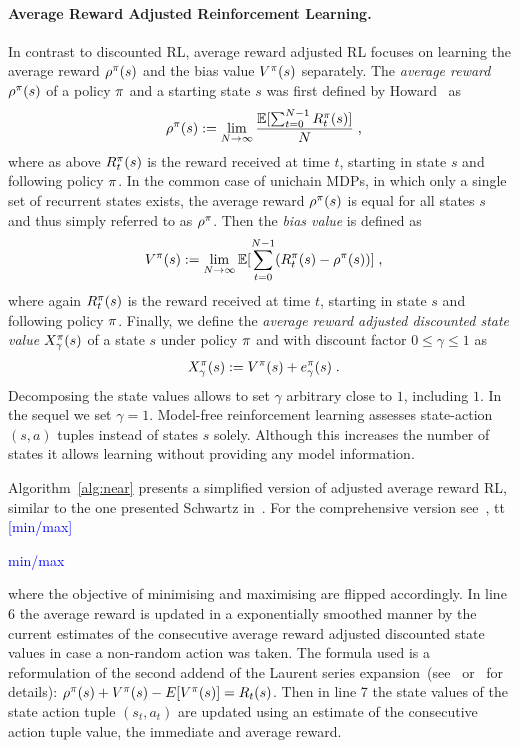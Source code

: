 \documentclass[envcountsame]{llncs}
\newcommand\MS[2][r]{\ifx t#1 \textcolor{blue}{[#2]}%
\else \begin{center}\textcolor{blue}{#2} \end{center} \fi}%
\begin{document}
\paragraph{Average Reward Adjusted Reinforcement Learning.} In contrast to discounted RL, average
reward adjusted RL focuses on learning the average reward \(\rho^{\pi}(s)\) and the bias value
\(V^{\pi}(s)\) separately.
%
The \textit{average reward} \(\rho^{\pi}(s)\) of a policy \(\pi\) and a starting state \(s\)
was first defined by Howard~\cite{howard1960dynamic} as
%
\begin{align*}
  \avgrew^{\pol}(s) \defsym \lim_{N \to \infty} \frac{\E [\sum_{t=0}^{N-1}R_{t}^{\pol}(s)]}{N}\tcom
\end{align*}
%
where as above \(R_{t}^{\pi}(s)\) is the reward received at time \(t\), starting in state \(s\) and
following policy \(\pi\). In the common case of unichain MDPs, in which only a single set of
recurrent states exists, the average reward \(\rho^{\pi}(s)\) is equal for all states
\(s\)~\cite{Mahadevan96_AverageRewardReinforcementLearningFoundationsAlgorithmsAndEmpiricalResults,Puterman94}
and thus simply referred to as \(\rho^{\pi}\). Then the \textit{bias value} is defined as
%
\begin{align*}
  V^{\pol}(s) \defsym \lim_{N \to \infty}{ \E [ \sum_{t=0}^{N-1}(R_{t}^{\pol}(s) - \avgrew^{\pol}(s) )]}\tcom
\end{align*}
%
where again \(R_{t}^{\pi}(s)\) is the reward received at time \(t\), starting in state \(s\) and
following policy \(\pi\). Finally, we define the \textit{average reward adjusted discounted state
  value} $X_{\gamma}^{\pi}(s)$ of a state $s$ under policy $\pi$ and with discount factor
$0 \leqslant \gamma \leqslant 1$ as
%
\begin{align*}
  \X_{\gamma}^{\pol}(s) \defsym V^{\pol}(s) + e_{\gamma}^{\pol}(s)\tpkt
\end{align*}
%
Decomposing the state values allows to set \(\gamma\) arbitrary close to \(1\), including \(1\). In
the sequel we set \(\gamma = 1\). Model-free reinforcement learning assesses state-action \((s,a)\)
tuples instead of states \(s\) solely. Although this increases the number of states it allows
learning without providing any model information.

Algorithm~\ref{alg:near} presents a simplified version of adjusted average reward RL, similar to the
one presented Schwartz in~\cite{schwartz1993reinforcement}. For the comprehensive version
see~\cite{schneckenreither2020average}, \MS[t]{min/max} where the objective of minimising and
maximising are flipped accordingly. In line 6 the average reward is updated in a exponentially
smoothed manner by the current estimates of the consecutive average reward adjusted discounted state
values in case a non-random action was taken. The formula used is a reformulation of the second
addend of the Laurent series expansion~(see~\cite{MillerVeinott1969} or~\cite[p.346]{Puterman94} for
details): \(\rho^{\pi}(s) + V^{\pi}(s) - E[V^{\pi}(s)] = R_{t}(s)\). Then in line 7 the state
values of the state action tuple \((s_{t}, a_{t})\) are updated using an estimate of the
consecutive action tuple value, the immediate and average reward. 
\end{document}
